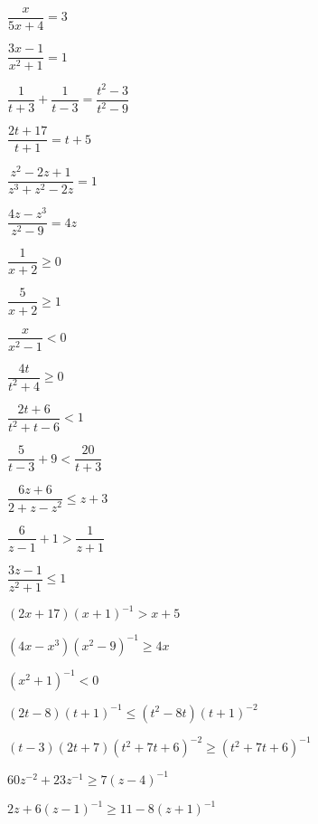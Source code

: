 \startexenum

\begin{exenum}

\item $\dfrac{x}{5x + 4} = 3$ \label{ratleqnexercisefirst}
\item $\dfrac{3x - 1}{x^{2} + 1} = 1$
\item $\dfrac{1}{t + 3} + \dfrac{1}{t - 3} = \dfrac{t^{2} - 3}{t^{2} - 9}$
\item $\dfrac{2t + 17}{t + 1} = t + 5$
\item $\dfrac{z^{2} - 2z + 1}{z^{3} + z^{2} - 2z} = 1$
\item $\dfrac{4z- z^3}{z^{2} - 9} = 4z$  \label{ratleqnexerciselast}


\item $\dfrac{1}{x + 2} \geq 0$ \label{ratlineqexercisefirst}
\item $\dfrac{5}{x + 2} \geq 1$
\item $\dfrac{x}{x^{2} - 1} <  0$
\item  $\dfrac{4t}{t^2+4} \geq 0$
\item  $\dfrac{2t+6}{t^2+t-6} < 1$
\item  $\dfrac{5}{t-3} + 9 < \dfrac{20}{t+3}$
\item  $\dfrac{6z+6}{2+z-z^2} \leq z+3$
\item $\dfrac{6}{z-1} + 1 > \dfrac{1}{z+1}$
\item $\dfrac{3z - 1}{z^{2} + 1} \leq 1$
\item $(2x+17)(x+1)^{-1} > x + 5$
\item $(4x-x^3)(x^{2} - 9)^{-1} \geq 4x$
\item $(x^{2} + 1)^{-1} < 0$ 
\item $(2t-8)(t+1)^{-1} \leq (t^2-8t)(t+1)^{-2}$ %
\item $(t-3)(2t+7)(t^2+7t+6)^{-2} \geq (t^2+7t+6)^{-1}$ %
\item $60z^{-2}+23z^{-1} \geq 7(z-4)^{-1}$
\item $2z+6(z-1)^{-1} \geq 11 - 8(z+1)^{-1}$ \label{ratlineqexerciselast}


\end{exenum}
